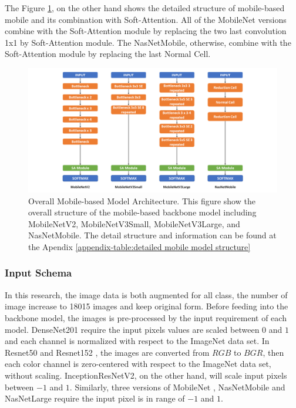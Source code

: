 \documentclass[sensors,article,submit,pdftex,moreauthors]{Definitions/mdpi}
\begin{document}
The Figure \ref{fig:mobile-model-structure}, on the other hand shows the detailed structure of mobile-based mobile and its combination with Soft-Attention. All of the MobileNet versions combine with the Soft-Attention module by replacing the two last convolution 1x1 by Soft-Attention module. The NasNetMobile, otherwise, combine with the Soft-Attention module by replacing the last Normal Cell. 
\begin{figure}[H]
	\centering
	\includegraphics[width=1\linewidth]{Definitions/Mobile Model Structure}
	\caption{Overall Mobile-based Model Architecture. This figure show the overall structure of the mobile-based backbone model including MobileNetV2, MobileNetV3Small, MobileNetV3Large, and NasNetMobile. The detail structure and information can be found at the Apendix \ref{appendix-table:detailed mobile model structure}}
	\label{fig:mobile-model-structure}
\end{figure}

\subsubsection{Input Schema}
In this research, the image data is both augmented for all class, the number of image increase to 18015 images and keep original form. Before feeding into the backbone model, the images is pre-processed by the input requirement of each model. DenseNet201 \cite{06993} require the input pixels values are scaled between $0$ and $1$ and each channel is normalized with respect to the ImageNet data set. In Resnet50 and Resnet152 \cite{03385} \cite{05027}, the images are converted from $RGB$ to $BGR$, then each color channel is zero-centered with respect to the ImageNet data set, without scaling. InceptionResNetV2\cite{11946}, on the other hand, will scale input pixels between $-1$ and $1$. Similarly, three versions of MobileNet \cite{04861} \cite{04381} \cite{02244}, NasNetMobile and NasNetLarge \cite{07012} require the input pixel is in range of $-1$ and $1$. 
\end{document}
